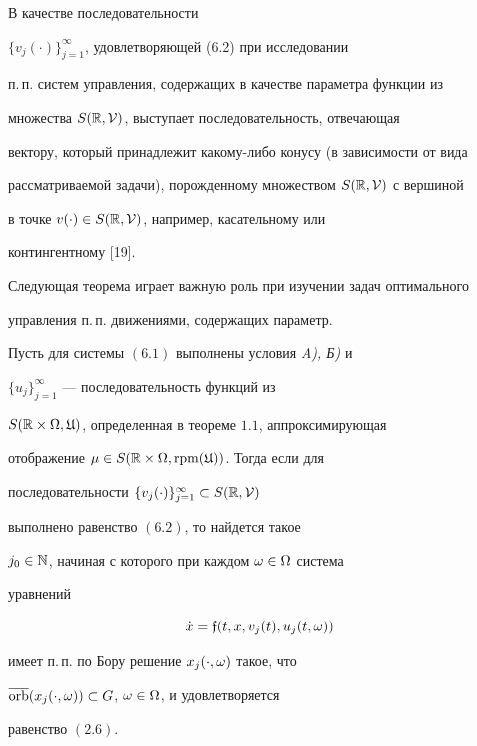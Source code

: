 \begin{notes}


В качестве последовательности


$\{v_{j}(\cdot)\}_{j=1}^{\infty}$, удовлетворяющей (6.2) при исследовании


п.\,п. систем управления, содержащих в качестве параметра функции из


множества $S(\Bbb R,\cal V)$, выступает последовательность, отвечающая


вектору, который принадлежит какому-либо конусу (в зависимости от вида


рассматриваемой задачи), порожденному множеством $S(\Bbb R,\cal V)$ с вершиной


в точке $v(\cdot)\in S(\Bbb R,\cal V)$, например, касательному или


контингентному [19].


\end{notes}





Следующая теорема играет важную роль при изучении задач оптимального


управления п.\,п. движениями, содержащих параметр.





\begin{thms}


Пусть для системы $(6.1)$ выполнены условия {\em A), Б)} и


$\{u_{j}\}_{j=1}^{\infty}$ --- последовательность функций из


$S(\Bbb R\times\Omega,\frak U)$, определенная в теореме $1.1$, аппроксимирующая


отображение $\mu\in S(\Bbb R\times\Omega,\operatorname{rpm}(\frak U))$. Тогда если для


последовательности $\{v_{j}(\cdot)\}_{j=1}^{\infty}\subset S(\Bbb R,\cal V)$


выполнено равенство $(6.2)$, то найдется такое


$j_{0}\in\Bbb N$, начиная с которого при каждом $\omega\in\Omega$ система


уравнений


\begin{equation}


\Dot x=\gf(t,x,v_{j}(t),u_{j}(t,\om))


\end{equation}


имеет п.\,п. по Бору решение $x_{j}(\cdot,\omega)$ такое, что


$\overline{\operatorname{orb}}(x_{j}(\cdot,\omega))\subset G$, $\omega\in \Omega$, и удовлетворяется


равенство $(2.6)$.


\end{thms}





